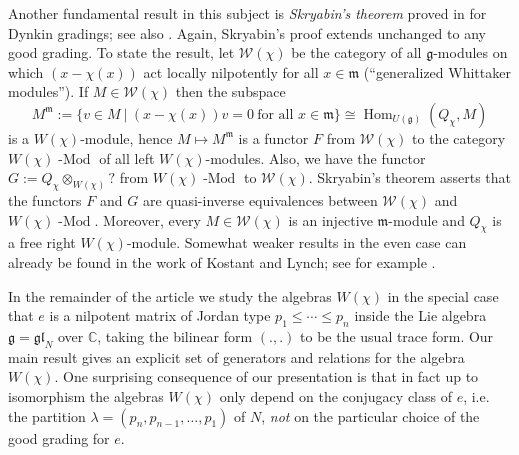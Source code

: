 \documentclass[twoside,12pt,reqno]{amsart}
\def\C{{\mathbb C}}
\def\hom{{\operatorname{Hom}}}
\def\Mod{\operatorname{\text{-}Mod}}
\begin{document}
Another fundamental result in this subject
is {\em Skryabin's theorem} proved in \cite{Skry} for
Dynkin gradings; see also \cite[Theorem 6.1]{GG}.
Again, Skryabin's proof extends unchanged to any
good grading. To state the result, 
let ${\mathscr W}(\chi)$ 
be the category of all $\mathfrak{g}$-modules on which
$(x-\chi(x))$ act locally nilpotently for all $x\in \mathfrak{m}$
(``generalized Whittaker modules''). 
If $M\in
{\mathscr W}(\chi)$ then the subspace
\begin{equation*}
M^\mathfrak{m}:=\{v\in M\:|\: (x-\chi(x))v=0\ \text{for all $x\in
\mathfrak{m}$}\}
\cong \hom_{U(\mathfrak{g})}(Q_\chi, M)
\end{equation*}
is a $W(\chi)$-module, hence 
$M\mapsto M^\mathfrak{m}$ is a functor $F$ 
from ${\mathscr W}(\chi)$ to the
category $W(\chi)\Mod$ of all left $W(\chi)$-modules.
Also, we have the functor $G:=Q_\chi \otimes_{W(\chi)} ?$ 
from
$W(\chi)\Mod$ to ${\mathscr W}(\chi)$.
{Skryabin's theorem} asserts 
that the functors ${F}$ and
${G}$ are quasi-inverse equivalences
between ${\mathscr W}(\chi)$ and $W(\chi)\Mod$.
Moreover, every $M\in {\mathscr W}(\chi)$ is an injective
$\mathfrak{m}$-module and $Q_\chi$ is a free right $W(\chi)$-module.
Somewhat weaker results in the even case can already be found in
the work of Kostant and Lynch; see 
for example \cite[Theorems 2.4, 4.1]{Ly}.

\vspace{2mm}

In the remainder of the article we study the algebras
$W(\chi)$ in the special case
that $e$ is a nilpotent matrix of Jordan type 
$p_1 \leq \cdots \leq p_n$ inside the Lie
algebra
$\mathfrak{g} = \mathfrak{gl}_N$
over $\C$, taking the bilinear form $(.,.)$ to be the usual
trace form. 
Our main result gives an explicit
set of generators and relations for the algebra $W(\chi)$.
One surprising 
consequence of our presentation is that in fact up to isomorphism
the algebras $W(\chi)$ only depend on the 
conjugacy class of $e$, i.e. the partition $\lambda = (p_n,p_{n-1},\dots,p_1)$
of $N$,
{\em not} on the particular choice of the good grading for $e$.
\end{document}
